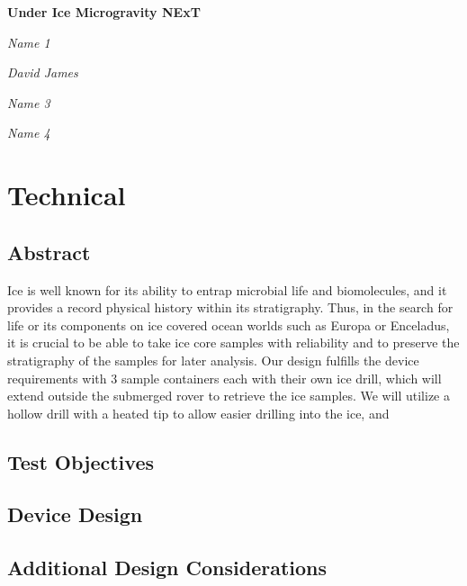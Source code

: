 \documentclass{article}
\begin{document}
\begin{titlepage}
\begin{center}

    \vspace{3cm}
    {\huge\bfseries Under Ice Microgravity NExT\par}
    \vspace{10cm}
    {\Large\itshape Name 1\par}
    {\Large\itshape David James\par}
    {\Large\itshape Name 3\par}
    {\Large\itshape Name 4\par}

\end{center}
\end{titlepage}

\begin{titlepage}
\tableofcontents
\end{titlepage}

\section{Technical}
\subsection{Abstract}
Ice is well known for its ability to entrap microbial life and biomolecules, and it provides a record physical history within its stratigraphy. Thus, in the search for life or its components on ice covered ocean worlds such as Europa or Enceladus, it is crucial to be able to take ice core samples with reliability and to preserve the stratigraphy of the samples for later analysis. Our design fulfills the device requirements with 3 sample containers each with their own ice drill, which will extend outside the submerged rover to retrieve the ice samples. We will utilize a hollow drill with a heated tip to allow easier drilling into the ice, and 

\subsection{Test Objectives}
\subsection{Device Design}
\subsection{Additional Design Considerations}
\end{document}
